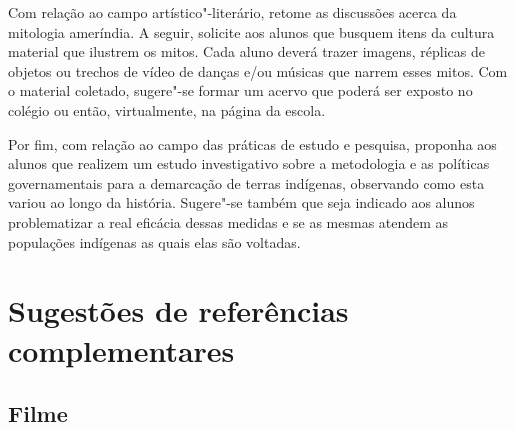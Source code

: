 \documentclass[12pt]{extarticle}
\begin{document}
Com relação ao campo artístico"-literário, retome as discussões acerca da mitologia ameríndia. A seguir,
  solicite aos alunos que busquem itens da cultura material que ilustrem
  os mitos. Cada aluno deverá trazer imagens, réplicas de objetos ou
  trechos de vídeo de danças e/ou músicas que narrem esses mitos. Com o
  material coletado, sugere"-se formar um acervo que poderá ser exposto
  no colégio ou então, virtualmente, na página da escola.




Por fim, com relação ao campo das práticas de estudo e pesquisa,
proponha aos alunos que realizem um estudo investigativo sobre a
metodologia e as políticas governamentais para a demarcação de terras
indígenas, observando como esta variou ao longo da história.
Sugere"-se também que seja indicado aos alunos problematizar a real
eficácia dessas medidas e se as mesmas atendem as populações indígenas
as quais elas são voltadas.




\section{Sugestões de referências complementares}

\subsection{Filme}
\end{document}
